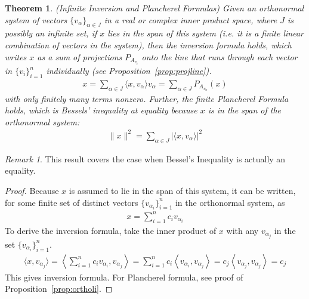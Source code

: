\documentclass[12pt]{book}
\numberwithin{equation}{section} %
\theoremstyle{plain}
\newtheorem{thm}{Theorem}[section]
\theoremstyle{definition}
\theoremstyle{remark}
\newtheorem*{rmk}{Remark}
\begin{document}
\begin{thm}
\label{thm:inversion}
\emph{(Infinite Inversion and Plancherel Formulas)}
Given an orthonormal system of vectors $\{v_\alpha\}_{\alpha\in J}$
in a real or complex inner product space,
where $J$ is possibly an infinite set,
if $x$ lies in the span of this system
(i.e. it is a finite linear combination of vectors in the system), then
the inversion formula holds,
which writes $x$ as a sum of projections $P_{A_{v_i}}$ onto the line
that runs through each vector in $\{v_i\}_{i=1}^n$ individually (see
Proposition~\ref{prop:projline}).
\begin{align}
  x
  = \sum_{\alpha\in J} \langle x,v_{\alpha}\rangle v_{\alpha}
  = \sum_{\alpha\in J} P_{A_{v_\alpha}}(x)
  \label{inversionformula}
\end{align}
with only finitely many terms nonzero.
Further, the finite Plancherel Formula holds, which is Bessels'
inequality at equality because $x$ is in the span of the orthonormal
system:
\begin{align}
  \lVert x\rVert^2 =
  \sum_{\alpha\in J} |\langle x,v_{\alpha}\rangle|^2
  \label{plancherel}
\end{align}
\end{thm}
\begin{rmk}
This result covers the case when Bessel's Inequality is actually an
equality.
\end{rmk}
\begin{proof}
Because $x$ is assumed to lie in the span of this system, it can be
written, for some finite set of distinct vectors
$\{v_{\alpha_i}\}_{i=1}^n$ in the orthonormal system, as
\begin{align*}
  x = \sum_{i=1}^n c_i v_{\alpha_i}
\end{align*}
To derive the inversion formula, take the inner product of $x$ with any
$v_{\alpha_j}$ in the set $\{v_{\alpha_i}\}_{i=1}^n$.
\begin{align*}
  \langle x, v_{\alpha_j}\rangle
  =
  \left\langle
  \sum_{i=1}^n c_i v_{\alpha_i}
  , v_{\alpha_j}
  \right\rangle
  =
  \sum_{i=1}^n
  c_i
  \left\langle
  v_{\alpha_i}
  , v_{\alpha_j}
  \right\rangle
  =
  c_j
  \left\langle
  v_{\alpha_j}
  , v_{\alpha_j}
  \right\rangle
  =
  c_j
\end{align*}
This gives inversion formula.
For Plancherel formula, see proof of Proposition~\ref{prop:ortholi}.
\end{proof}
\end{document}
